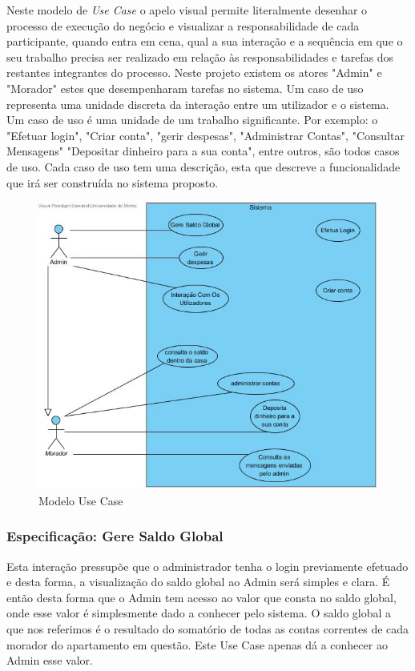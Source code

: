 Neste modelo de \textit{Use Case} o apelo visual permite literalmente desenhar o processo de execução do negócio e visualizar a responsabilidade de cada participante, quando entra em cena, qual a sua interação e a sequência em que o seu trabalho precisa ser realizado em relação às responsabilidades e tarefas dos restantes integrantes do processo. Neste projeto existem os atores "Admin" e "Morador" estes que desempenharam tarefas no sistema.  Um caso de uso representa uma unidade discreta da interação entre um utilizador e o sistema. Um caso de uso é uma unidade de um trabalho significante. Por exemplo: o "Efetuar login", "Criar conta", "gerir despesas", "Administrar Contas", "Consultar Mensagens" "Depositar dinheiro para a sua conta", entre outros, são todos casos de uso. Cada caso de uso tem uma descrição, esta que descreve a funcionalidade que irá ser construída no sistema proposto. 


\begin{figure}[htb!]
	\centering
	\includegraphics[scale=0.5]{imagens/useCase/UseCase}  
	\caption{Modelo Use Case}  
\end{figure}

\newpage
\subsubsection{Especificação: Gere Saldo Global }

Esta interação pressupõe que o administrador  tenha o login previamente efetuado e desta forma, a visualização do saldo global ao Admin será simples e clara. É então desta forma que o Admin tem acesso ao valor que consta no saldo global, onde esse valor é simplesmente dado a conhecer pelo sistema. O saldo global a que nos referimos é o resultado do somatório de todas as contas correntes de cada morador do apartamento em questão. Este Use Case apenas dá a conhecer ao Admin esse valor.

